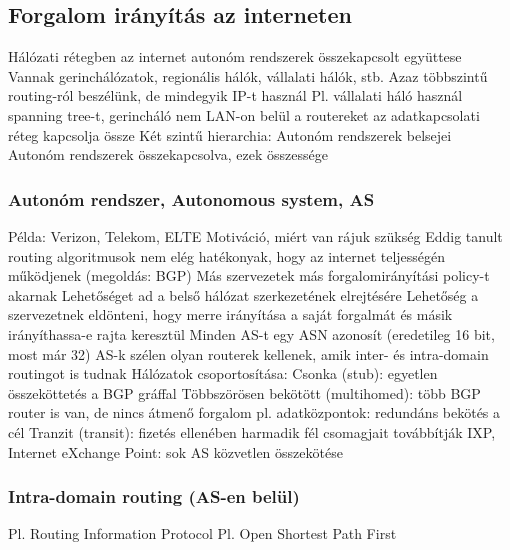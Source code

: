 \documentclass[12pt,a4paper]{article}
\begin{document}
\pagebreak

\subsection{Forgalom irányítás az interneten}

\begin{outline}
	\1 Hálózati rétegben az internet autonóm rendszerek összekapcsolt együttese
		\2 Vannak gerinchálózatok, regionális hálók, vállalati hálók, stb.
		\2 Azaz többszintű routing-ról beszélünk, de mindegyik IP-t használ
			\3 Pl. vállalati háló használ spanning tree-t, gerincháló nem
		\2 LAN-on belül a routereket az adatkapcsolati réteg kapcsolja össze
	\1 Két szintű hierarchia:
		\2 Autonóm rendszerek belsejei
		\2 Autonóm rendszerek összekapcsolva, ezek összessége
\end{outline}

\subsubsection{Autonóm rendszer, Autonomous system, AS}

\begin{outline}
	\1 Példa: Verizon, Telekom, ELTE
	\1 Motiváció, miért van rájuk szükség
		\2 Eddig tanult routing algoritmusok nem elég hatékonyak, hogy az internet teljességén működjenek (megoldás: BGP)
		\2 Más szervezetek más forgalomirányítási policy-t akarnak
		\2 Lehetőséget ad a belső hálózat szerkezetének elrejtésére
		\2 Lehetőség a szervezetnek eldönteni, hogy merre irányítása a saját forgalmát és másik irányíthassa-e rajta keresztül
	\1 Minden AS-t egy ASN azonosít (eredetileg 16 bit, most már 32)
	\1 AS-k szélen olyan routerek kellenek, amik inter- és intra-domain routingot is tudnak
	\1 Hálózatok csoportosítása:
		\2 Csonka (stub): egyetlen összeköttetés a BGP gráffal
		\2 Többszörösen bekötött (multihomed): több BGP router is van, de nincs átmenő forgalom
			\3 pl. adatközpontok: redundáns bekötés a cél
		\2 Tranzit (transit): fizetés ellenében harmadik fél csomagjait továbbítják
		\2 IXP, Internet eXchange Point: sok AS közvetlen összekötése
\end{outline}

\pagebreak

\subsubsection{Intra-domain routing (AS-en belül)}

\begin{outline}
	\1 Pl. Routing Information Protocol
	\1 Pl. Open Shortest Path First
\end{outline}
\end{document}
